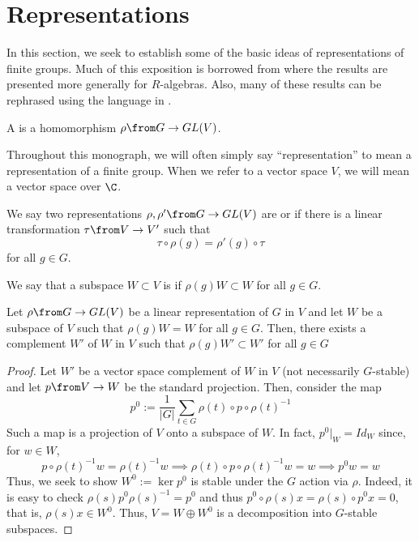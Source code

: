 \documentclass[11pt,leqno,oneside]{amsbook}
\numberwithin{thm}{section}
\begin{document}
\section{Representations}
In this section, we seek to establish some of the basic ideas of
representations of finite groups. Much of this exposition is borrowed
from \cite{etingof} where the results are presented more generally for
\(R\)-algebras. Also, many of these results can be rephrased using the
language in \cite{aw}.
\begin{defn}
  A  is a
  homomorphism \(\rho \from G \to GL(V)\).
\end{defn}
\begin{rmk}
  Throughout this monograph, we will often simply say
  ``representation'' to mean a representation of a finite group. When
  we refer to a vector space \(V\), we will mean a vector space over \(\C\).
\end{rmk}
\begin{defn}
  We say two representations \(\rho, \rho' \from G \to GL(V)\) are
   or  if 
  there is a linear transformation \(\tau \from V \to V'\) such
  that \[
    \tau \circ \rho(g) = \rho'(g) \circ \tau
  \]
  for all \(g \in G\).
\end{defn}
\begin{defn}
  We say that a subspace \(W \subset V\) is  if
  \(\rho(g)W \subset W\) for all \(g \in G\).
\end{defn}
\begin{prop}
  Let \(\rho \from G \to GL(V)\) be a linear representation of \(G\)
  in \(V\) and let \(W\) be a subspace of \(V\) such that \(\rho(g)W =
  W\) for all \(g \in G\). Then, there exists a complement \(W'\) of
  \(W\) in \(V\) such that \(\rho(g)W' \subset W'\) for all \(g \in G\)
\end{prop}
\begin{proof}
  Let \(W'\) be a vector space complement of \(W\) in \(V\) (not
  necessarily \(G\)-stable) and let \(p \from V \to W\) be the
  standard projection. Then, consider the map \[
    p^0 := \frac{1}{|G|} \sum_{t \in G} \rho(t) \circ p \circ \rho(t)^{-1}
  \]
  Such a map is a projection of \(V\) onto a subspace of \(W\). In
  fact, \(p^0|_W = Id_W\) since, for \(w \in W\), \[
    p \circ \rho(t)^{-1} w = \rho(t)^{-1} w \implies \rho(t) \circ p
    \circ \rho(t)^{-1} w = w \implies p^0 w = w
  \]
  Thus, we seek to show \(W^0 := \ker p^0\) is stable under the \(G\)
  action via \(\rho\). Indeed, it is easy to check \(\rho(s) p^0
  \rho(s)^{-1} = p^0\) and thus \(p^0 \circ \rho(s)x = \rho(s) \circ
  p^0 x = 0\), that is, \(\rho(s) x \in W^0\). Thus, \(V = W \oplus
  W^0\) is a decomposition into \(G\)-stable subspaces. 
\end{proof}
\end{document}
